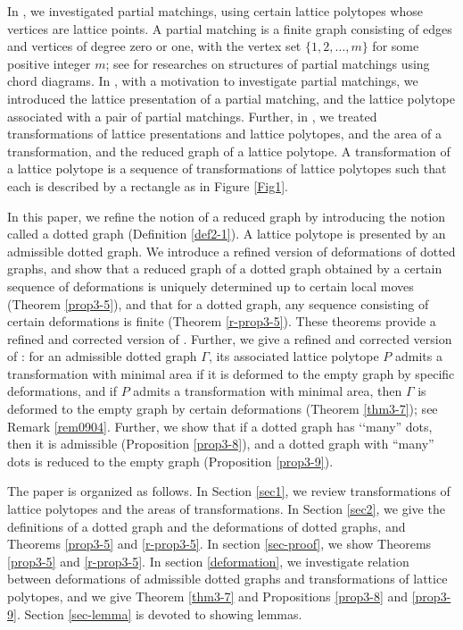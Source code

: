 \documentclass[a4paper,11pt]{amsart}
\numberwithin{equation}{section}
\begin{document}
In \cite{N}, we investigated partial matchings, using certain lattice polytopes whose vertices are lattice points. 
A partial matching is a finite graph consisting of edges and vertices of degree zero or one, with the vertex set $\{1,2,\ldots,m\}$ for some positive integer $m$; see \cite{Reidys} for researches on structures of partial matchings using chord diagrams. 
In \cite{N}, with a motivation to investigate partial matchings, we introduced the lattice presentation of a partial matching, and the lattice polytope associated with a pair of partial matchings. Further, in \cite{N}, we treated transformations of lattice presentations and lattice polytopes, and the area of a transformation, and the reduced graph of a lattice polytope. A transformation of a lattice polytope is a sequence of transformations of lattice polytopes such that each is described by a rectangle as in Figure \ref{Fig1}. 

In this paper, we refine the notion of a reduced graph by introducing the notion called a dotted graph (Definition \ref{def2-1}). 
A lattice polytope is presented by an admissible dotted graph.
%
We introduce a refined version of deformations of dotted graphs, and 
show that a reduced graph of a dotted graph obtained by a certain sequence of deformations is uniquely determined up to certain local moves (Theorem \ref{prop3-5}), and that for a dotted graph, any sequence consisting of certain deformations is finite (Theorem \ref{r-prop3-5}). These theorems provide a refined and corrected version of \cite[Lemma 6.2]{N}. 
%
Further, we give a refined and corrected version of \cite[Theorem 6.3]{N}: 
for an admissible dotted graph $\Gamma$, its associated lattice polytope $P$ admits a transformation with minimal area if it is deformed to the empty graph by specific deformations, and if $P$ admits a transformation with minimal area, then $\Gamma$ is deformed to the empty graph by certain deformations (Theorem \ref{thm3-7}); see Remark \ref{rem0904}. Further, we show that if a dotted graph has \lq\lq many'' dots, then it is admissible (Proposition \ref{prop3-8}), and a dotted graph with ``many'' dots is reduced to the empty graph (Proposition \ref{prop3-9}). 


The paper is organized as follows. In Section \ref{sec1}, we review transformations of lattice polytopes and the areas of transformations. 
In Section \ref{sec2}, we give the definitions of a dotted graph and the deformations of dotted graphs, and Theorems \ref{prop3-5} and \ref{r-prop3-5}. 
In section \ref{sec-proof}, we show Theorems \ref{prop3-5} and \ref{r-prop3-5}. 
In section \ref{deformation}, we investigate relation between deformations of admissible dotted graphs and transformations of lattice polytopes, and we give Theorem \ref{thm3-7} and Propositions \ref{prop3-8} and \ref{prop3-9}. 
Section \ref{sec-lemma} is devoted to showing lemmas. 
\end{document}
